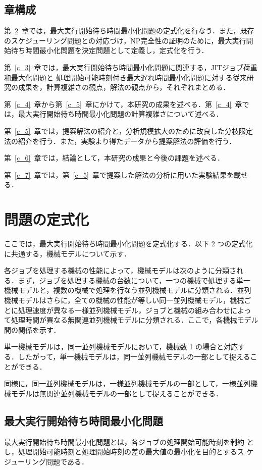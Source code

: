 \documentclass[12pt]{optlab-bachelor}
\begin{document}
\section{章構成}
第~\ref{c_2}~章では，最大実行開始待ち時間最小化問題の定式化を行なう．また，既存のスケジューリング問題との対応づけ，NP完全性の証明のために，最大実行開始待ち時間最小化問題を決定問題として定義し，定式化を行う．

第~\ref{c_3}~章では，最大実行開始待ち時間最小化問題に関連する，JITジョブ荷重和最大化問題と
処理開始可能時刻付き最大遅れ時間最小化問題に対する従来研究の成果を，計算複雑さの観点，解法の観点から，それぞれまとめる．

第~\ref{c_4}~章から第~\ref{c_5}~章にかけて，本研究の成果を述べる．第~\ref{c_4}~章では，最大実行開始待ち時間最小化問題の計算複雑さについて述べる．

第~\ref{c_5}~章では，提案解法の紹介と，分析規模拡大のために改良した分枝限定法の紹介を行う．また，実験より得たデータから提案解法の評価を行う．

第~\ref{c_6}~章では，結論として，本研究の成果と今後の課題を述べる．

第~\ref{c_7}~章では，第~\ref{c_5}~章で提案した解法の分析に用いた実験結果を載せる．

\chapter{問題の定式化}\label{c_2}
ここでは，最大実行開始待ち時間最小化問題を定式化する．以下 2 つの定式化に共通する，機械モデルについて示す．

各ジョブを処理する機械の性能によって，機械モデルは次のように分類され
る．まず，ジョブを処理する機械の台数について，一つの機械で処理する単一
機械モデルと，複数の機械で処理を行なう並列機械モデルに分類される．並列
機械モデルはさらに，全ての機械の性能が等しい同一並列機械モデル，機械ご
とに処理速度が異なる一様並列機械モデル，ジョブと機械の組み合わせによっ
て処理時間が異なる無関連並列機械モデルに分類される．ここで，各機械モデル間の関係を示す．

単一機械モデルは，同一並列機械モデルにおいて，機械数 1 の場合と対応する．したがって，単一機械モデルは，同一並列機械モデルの一部として捉えることができる．

同様に，同一並列機械モデルは，一様並列機械モデルの一部として，一様並列機械モデルは無関連並列機械モデルの一部として捉えることができる．

\section{最大実行開始待ち時間最小化問題}
最大実行開始待ち時間最小化問題とは，各ジョブの処理開始可能時刻を制約
とし，処理開始可能時刻と処理開始時刻の差の最大値の最小化を目的とするス
ケジューリング問題である．
\end{document}
